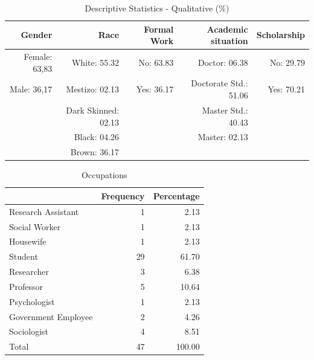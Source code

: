 \documentclass[compress]{beamer}
\begin{document}
\begin{frame}
	\begin{table}[ht]
			\centering
			\scriptsize
			\caption{Descriptive Statistics - Qualitative (\%)}
			\label{quali}
		
		\begin{tabular}{rrrrr}
				\hline
				Gender & Race & Formal Work & Academic situation & Scholarship \\ 
				\hline
				Female: 63,83   & White: 55.32   & No: 63.83  & Doctor: 06.38   & No: 29.79 \\ 
				Male: 36,17      & Mestizo: 02.13   & Yes: 36.17 & Doctorate Std.: 51.06  & Yes: 70.21 \\ 
				& Dark Skinned: 02.13   &  & Master Std.: 40.43 &  \\ 
				& Black: 04.26   &  & Master: 02.13 &  \\ 
				& Brown: 36.17   &  &  &  \\ 
				\hline
			\end{tabular}
		
	\end{table}
\end{frame}

\begin{frame}
	\begin{table}[ht]
			\centering
			\footnotesize
			\caption{Occupations}
			\label{occupations}
		
		\begin{tabular}{lrr}
				\hline
				& Frequency & Percentage \\ 
				\hline
				Research Assistant &   1 & 2.13 \\ 
				Social Worker &   1 & 2.13 \\ 
				Housewife &   1 & 2.13 \\ 
				Student &  29 & 61.70 \\ 
				Researcher &   3 & 6.38 \\ 
				Professor &   5 & 10.64 \\ 
				Psychologist &   1 & 2.13 \\ 
				Government Employee &   2 & 4.26 \\ 
				Sociologist &   4 & 8.51 \\ 
				Total &  47 & 100.00 \\ 
				\hline
			\end{tabular}

	\end{table}
\end{frame}
\end{document}

